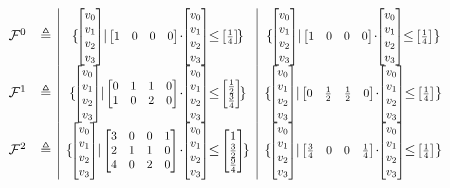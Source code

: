 \begin{example}
	\begin{figure}[t]
		\[
		\begin{array}{rc|c|c}
			\mathcal{F}^0 & \eqdef & \{\,\cvec{v_0}{v_1}{v_2}{v_3} \mid {\scalebox{\vecscale}{$ \!\begin{bmatrix} 1 & 0 & 0 &0 \end{bmatrix}\!$}} \cdot \cvec{v_0}{v_1}{v_2}{v_3} \leq {\scalebox{\vecscale}{$ \!\begin{bmatrix} \frac{1}{4}  \end{bmatrix}\!$} } \}                                                                          & \{\,\cvec{v_0}{v_1}{v_2}{v_3} \mid {\scalebox{\vecscale}{$ \!\begin{bmatrix} 1 & 0 & 0 &0 \end{bmatrix}\!$}} \cdot \cvec{v_0}{v_1}{v_2}{v_3} \leq {\scalebox{\vecscale}{$ \!\begin{bmatrix} \frac{1}{4}  \end{bmatrix}\!$} } \,\}                                                                         \\
			\mathcal{F}^1 & \eqdef & \{\,\cvec{v_0}{v_1}{v_2}{v_3} \mid {\scalebox{\vecscale}{$ \!\begin{bmatrix} 0 & 1 & 1 &0 \\ 1&0 &2 &0 \end{bmatrix}\!$}} \cdot \cvec{v_0}{v_1}{v_2}{v_3} \leq {\scalebox{\vecscale}{$ \!\begin{bmatrix} \frac{1}{2} \\ \frac{3}{4} \end{bmatrix}\!$} } \}                                               & \{\,\cvec{v_0}{v_1}{v_2}{v_3} \mid {\scalebox{\vecscale}{$ \!\begin{bmatrix} 0 & \frac{1}{2} & \frac{1}{2} &0 \end{bmatrix}\!$}} \cdot \cvec{v_0}{v_1}{v_2}{v_3} \leq {\scalebox{\vecscale}{$ \!\begin{bmatrix} \frac{1}{4}  \end{bmatrix}\!$} } \,\}                                                     \\
			\mathcal{F}^2 & \eqdef & \{\,\cvec{v_0}{v_1}{v_2}{v_3} \mid {\scalebox{\vecscale}{$ \!\begin{bmatrix} 3 & 0 & 0 & 1 \\ 2&1 &1 &0 \\ 4&0&2&0\end{bmatrix}\!$}} \cdot \cvec{v_0}{v_1}{v_2}{v_3} \leq {\scalebox{\vecscale}{$ \!\begin{bmatrix}1 \\ \frac{3}{2} \\ \frac{9}{4}  \end{bmatrix}\!$} } \}                               & \{\,\cvec{v_0}{v_1}{v_2}{v_3} \mid {\scalebox{\vecscale}{$ \!\begin{bmatrix} \frac{3}{4} & 0 & 0 & \frac{1}{4} \end{bmatrix}\!$}} \cdot \cvec{v_0}{v_1}{v_2}{v_3} \leq {\scalebox{\vecscale}{$ \!\begin{bmatrix} \frac{1}{4}  \end{bmatrix}\!$} } \,\}                                                    \\

\end{array}\]
\end{figure}
\end{example}
